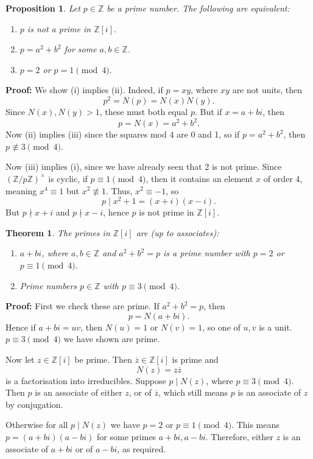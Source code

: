 \documentclass[12pt]{article}
\newtheorem{theorem}{Theorem}[section]
\newtheorem{proposition}{Proposition}[section]
\theoremstyle{definition}
\theoremstyle{remark}
\begin{document}
\begin{proposition}
	Let $p \in \mathbb{Z}$ be a prime number. The following are equivalent:
	\begin{enumerate}[label = (\roman*)]
		\item $p$ is not a prime in $\mathbb{Z}[i]$.
		\item $p = a^2 + b^2$ for some $a, b \in \mathbb{Z}$.
		\item $p = 2$ or $p = 1 \pmod 4$.
	\end{enumerate}
\end{proposition}

\begin{adjustbox}{minipage = \columnwidth - 25.5pt, margin=1em, frame=1pt, margin=0em}
	\textbf{Proof:} We show (i) implies (ii). Indeed, if $p = xy$, where $xy$ are not units, then
	\[
		p^2 = N(p) = N(x)N(y)
	.\] 
	Since $N(x), N(y) > 1$, these must both equal $p$. But if $x = a + bi$, then
	\[
		p = N(x) = a^2 + b^2
	.\]
	Now (ii) implies (iii) since the squares mod 4 are 0 and 1, so if $p = a^2 + b^2$, then $p \not \equiv 3 \pmod 4$.

	Now (iii) implies (i), since we have already seen that 2 is not prime. Since $(\mathbb{Z} / p \mathbb{Z})^{\times}$ is cyclic, if $p \equiv 1 \pmod 4$, then it contains an element $x$ of order 4, meaning $x^{4} \equiv 1$ but $x^2 \not \equiv 1$. Thus, $x^2 \equiv -1$, so
	\[
		p \mid x^2 + 1 = (x + i)(x - i)
	.\]
	But $p \nmid x + i$ and $p \nmid x - i$, hence $p$ is not prime in $\mathbb{Z}[i]$.
\end{adjustbox}

\begin{theorem}
	The primes in $\mathbb{Z}[i]$ are (up to associates):
	\begin{enumerate}[label = (\roman*)]
		\item $a + bi$, where $a, b \in \mathbb{Z}$ and $a^2 + b^2 = p$ is a prime number with $p = 2$ or $p \equiv 1 \pmod 4$.
		\item Prime numbers $p \in \mathbb{Z}$ with $p \equiv 3 \pmod 4$.
	\end{enumerate}
\end{theorem}

\begin{adjustbox}{minipage = \columnwidth - 25.5pt, margin=1em, frame=1pt, margin=0em}
\textbf{Proof:} First we check these are prime. If $a^2 + b^2 = p$, then
\[
	p = N(a + bi)
.\]
Hence if $a + bi = uv$, then $N(u) = 1$ or $N(v) = 1$, so one of $u, v$ is a unit. $p \equiv 3 \pmod 4$ we have shown are prime.

Now let $z \in \mathbb{Z}[i]$ be prime. Then $\overline{z} \in \mathbb{Z}[i]$ is prime and
\[
	N(z) = z \overline{z}
\]
is a factorisation into irreducibles. Suppose $p \mid N(z)$, where $p \equiv 3 \pmod 4$. Then $p$ is an associate of either $z$, or of $\overline{z}$, which still means $p$ is an associate of $z$ by conjugation.

Otherwise for all $p \mid N(z)$ we have $p = 2$ or $p \equiv 1 \pmod 4$. This means $p = (a + bi)(a - bi)$ for some primes $a + bi, a - bi$. Therefore, either $z$ is an associate of $a + bi$ or of $a - bi$, as required.
\end{adjustbox}
\end{document}
